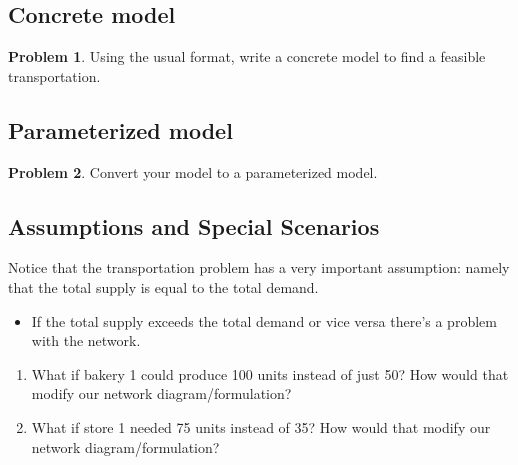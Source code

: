 \documentclass[11pt]{article}
\theoremstyle{definition}
\newtheorem{problem}{Problem}
\begin{document}
\subsection{Concrete model}
\begin{problem}
Using the usual format, write a concrete model to find a feasible transportation.
\end{problem}





\newpage

\subsection{Parameterized model}

\begin{problem}
Convert your model to a parameterized model. 
\end{problem}




\newpage

\subsection{Assumptions and Special Scenarios}

Notice that the transportation problem has a very important assumption: namely that the total supply is equal to the total demand.
\begin{itemize}
\item If the total supply exceeds the total demand or vice versa there's a problem with the network. \vspace{1.5in}
\end{itemize}

\begin{enumerate}
\item What if bakery 1 could produce 100 units instead of just 50? How would that modify our network diagram/formulation? \vspace{2.5in}
\item What if store 1 needed 75 units instead of 35? How would that modify our network diagram/formulation? \newpage
\end{enumerate}
\end{document}
